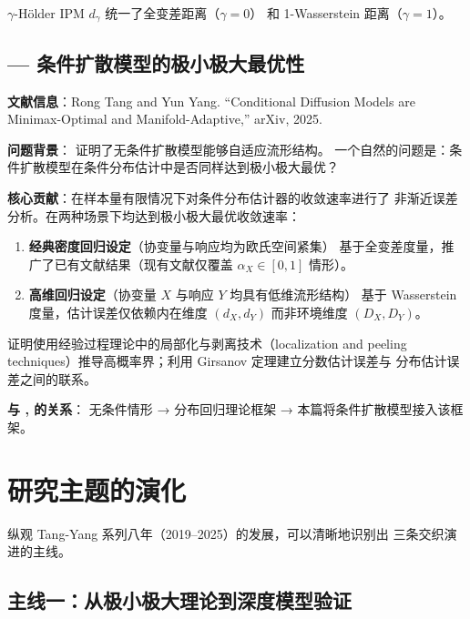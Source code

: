 \documentclass[12pt]{amsbook}
\theoremstyle{plain}
\begin{document}
$\gamma$-Hölder IPM $d_\gamma$ 统一了全变差距离（$\gamma=0$）
和 1-Wasserstein 距离（$\gamma=1$）。

\subsection{\citep{tang2025conditional} --- 条件扩散模型的极小极大最优性}
\label{sec:tang-arxiv2025b}

\textbf{文献信息}：Rong Tang and Yun Yang.
``Conditional Diffusion Models are Minimax-Optimal and Manifold-Adaptive,''
arXiv, 2025.

\textbf{问题背景}：\citep{tang2024diffusion} 证明了无条件扩散模型能够自适应流形结构。
一个自然的问题是：条件扩散模型在条件分布估计中是否同样达到极小极大最优？

\textbf{核心贡献}：在样本量有限情况下对条件分布估计器的收敛速率进行了
非渐近误差分析。在两种场景下均达到极小极大最优收敛速率：
\begin{enumerate}
    \item \textbf{经典密度回归设定}（协变量与响应均为欧氏空间紧集）
          基于全变差度量，推广了已有文献结果（现有文献仅覆盖
          $\alpha_X \in [0,1]$ 情形）。
    \item \textbf{高维回归设定}（协变量 $X$ 与响应 $Y$ 均具有低维流形结构）
          基于 Wasserstein 度量，估计误差仅依赖内在维度 $(d_X, d_Y)$
          而非环境维度 $(D_X, D_Y)$。
\end{enumerate}

证明使用经验过程理论中的局部化与剥离技术（localization and peeling
techniques）推导高概率界；利用 Girsanov 定理建立分数估计误差与
分布估计误差之间的联系。

\textbf{与 \citep{tang2024diffusion}, \citep{tang2025regression} 的关系}：\citep{tang2024diffusion} 无条件情形
→ \citep{tang2025regression} 分布回归理论框架 → 本篇将条件扩散模型接入该框架。

\section{研究主题的演化}\label{sec:tang-evolution}

纵观 Tang-Yang 系列八年（2019--2025）的发展，可以清晰地识别出
三条交织演进的主线。

\subsection{主线一：从极小极大理论到深度模型验证}\label{sec:tang-line1}
\end{document}
